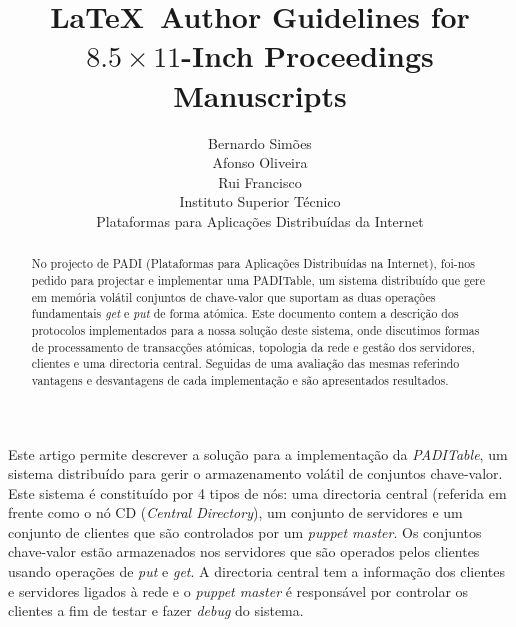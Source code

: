 \documentclass[times, 10pt,twocolumn]{article}
\begin{document}
\title{\LaTeX\ Author Guidelines 
       for {\boldmath $8.5 \times 11$-Inch} Proceedings Manuscripts}

\author{Bernardo Simões\\ Afonso Oliveira\\ Rui Francisco\\
Instituto Superior Técnico\\Plataformas para Aplicações Distribuídas da Internet\\
}

\maketitle
\thispagestyle{empty}

\begin{abstract}
No projecto de PADI (Plataformas para Aplicações Distribuídas na Internet), foi-nos pedido para projectar e implementar uma PADITable, um sistema distribuído que gere em memória volátil conjuntos de chave-valor que suportam as duas operações fundamentais \emph{get} e \emph{put} de forma atómica.
Este documento contem a descrição dos protocolos implementados para a nossa solução deste sistema, onde discutimos formas de processamento de transacções atómicas, topologia da rede e gestão dos servidores, clientes e uma directoria central. Seguidas de uma avaliação das mesmas referindo vantagens e desvantagens de cada implementação e são apresentados resultados.\end{abstract}




Este artigo permite descrever a solução para a implementação da \emph{PADITable}, um sistema distribuído para gerir o armazenamento volátil de conjuntos chave-valor. Este sistema é constituído por 4 tipos de nós: uma directoria central (referida em frente como o nó CD (\emph{Central Directory}), um conjunto de servidores e um conjunto de clientes que são controlados por um \emph{puppet master}. Os conjuntos chave-valor estão armazenados nos servidores que são operados pelos clientes usando operações de \emph{put} e \emph{get}. A directoria central tem a informação dos clientes e servidores ligados à rede e o \emph{puppet master} é responsável por controlar os clientes a fim de testar e fazer \emph{debug} do sistema.
\end{document}
